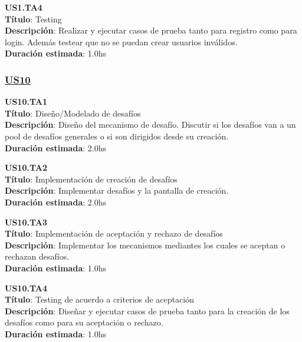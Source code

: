 \begin{tcolorbox}
\textbf{US1.TA4} \\
\textbf{Título}: Testing \\
\textbf{Descripción}: Realizar y ejecutar casos de prueba tanto para registro como para login. Además testear que no se puedan crear usuarios inválidos. \\
\textbf{Duración estimada}: 1.0hs
\end{tcolorbox}
\vspace{10pt}

\subsubsection*{\underline{US10}}

\begin{tcolorbox}
\textbf{US10.TA1} \\
\textbf{Título}: Diseño/Modelado de desafíos \\
\textbf{Descripción}: Diseño del mecanismo de desafío. Discutir si los desafíos van a un pool de desafíos generales o si son dirigidos desde su creación.\\
\textbf{Duración estimada}: 2.0hs
\end{tcolorbox}
\vspace{10pt}

\begin{tcolorbox}
\textbf{US10.TA2} \\
\textbf{Título}: Implementación de creación de desafíos \\
\textbf{Descripción}: Implementar desafíos y la pantalla de creación.\\
\textbf{Duración estimada}: 2.0hs
\end{tcolorbox}
\vspace{10pt}

\begin{tcolorbox}
\textbf{US10.TA3} \\
\textbf{Título}: Implementación de aceptación y rechazo de desafíos \\
\textbf{Descripción}: Implementar los mecanismos mediantes los cuales se aceptan  o rechazan desafíos.\\
\textbf{Duración estimada}: 1.0hs
\end{tcolorbox}
\vspace{10pt}

\begin{tcolorbox}
\textbf{US10.TA4} \\
\textbf{Título}: Testing de acuerdo a criterios de aceptación \\
\textbf{Descripción}: Diseñar y ejecutar casos de prueba tanto para la creación de los desafíos como para su aceptación o rechazo.\\
\textbf{Duración estimada}: 1.0hs
\end{tcolorbox}
\vspace{10pt}



